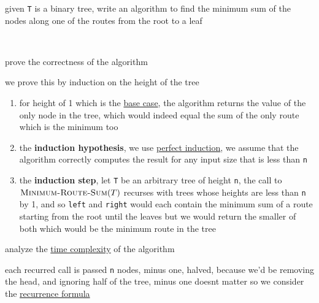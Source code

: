 \documentclass[a4paper,12pt]{article}
\begin{document}
\begin{question}
given \texttt{T} is a binary tree, write an algorithm to find the minimum sum of the nodes along one of the routes from the root to a leaf\\[0pt]
\begin{answer}
\begin{center}

\end{center}\\[0pt]
\end{answer}
\begin{subquestion}
prove the correctness of the algorithm\\[0pt]
\begin{answer}
we prove this by induction on the height of the tree\\[0pt]
\begin{enumerate}
\item for height of 1 which is the \href{2022-12-14T13_06_16.539Z.Desktop.org}{base case}, the algorithm returns the value of the only node in the tree, which would indeed equal the sum of the only route which is the minimum too\\[0pt]
\item the \textbf{induction hypothesis}, we use \href{20220707193301-mathematical_induction.org}{perfect induction}, we assume that the algorithm correctly computes the result for any input size that is less than \texttt{n}\\[0pt]
\item the \textbf{induction step}, let \texttt{T} be an arbitrary tree of height \texttt{n}, the call to \(\textsc{Minimum-Route-Sum}(T)\) recurses with trees whose heights are less than \texttt{n} by 1, and so \texttt{left} and \texttt{right} would each contain the minimum sum of a route starting from the root until the leaves but we would return the smaller of both which would be the minimum route in the tree\\[0pt]
\end{enumerate}
\end{answer}
\end{subquestion}
\begin{subquestion}
analyze the \href{20221130014441-time_complexity.org}{time complexity} of the algorithm\\[0pt]
\begin{answer}
each recurred call is passed \texttt{n} nodes, minus one, halved, because we'd be removing the head, and ignoring half of the tree, minus one doesnt matter so we consider the \href{2022-12-14T13_06_16.539Z.Desktop.org}{recurrence formula}\\[0pt]

\end{answer}
\end{subquestion}
\end{question}
\end{document}
